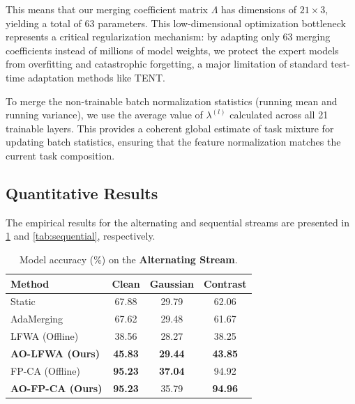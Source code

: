 \documentclass{article}
\theoremstyle{plain}
\theoremstyle{definition}
\begin{document}
This means that our merging coefficient matrix $\Lambda$ has dimensions of $21 \times 3$, yielding a total of 63 parameters. This low-dimensional optimization bottleneck represents a critical regularization mechanism: by adapting only 63 merging coefficients instead of millions of model weights, we protect the expert models from overfitting and catastrophic forgetting, a major limitation of standard test-time adaptation methods like TENT.

To merge the non-trainable batch normalization statistics (running mean and running variance), we use the average value of $\lambda^{(l)}$ calculated across all 21 trainable layers. This provides a coherent global estimate of task mixture for updating batch statistics, ensuring that the feature normalization matches the current task composition.

\subsection{Quantitative Results}

The empirical results for the alternating and sequential streams are presented in \cref{tab:alternating} and \cref{tab:sequential}, respectively.

\begin{table}[t]
\caption{Model accuracy (\%) on the \textbf{Alternating Stream}.}
\label{tab:alternating}
\vskip 0.08in
\centering
\begin{small}
\begin{sc}
\begin{tabular}{lccc}
\toprule
Method & Clean & Gaussian & Contrast \\
\midrule
Static     & 67.88 & 29.79 & 62.06 \\
AdaMerging & 67.62 & 29.48 & 61.67 \\
\midrule
LFWA (Offline)  & 38.56 & 28.27 & 38.25 \\
\textbf{AO-LFWA (Ours)} & \textbf{45.83} & \textbf{29.44} & \textbf{43.85} \\
\midrule
FP-CA (Offline)  & \textbf{95.23} & \textbf{37.04} & 94.92 \\
\textbf{AO-FP-CA (Ours)} & \textbf{95.23} & 35.79 & \textbf{94.96} \\
\bottomrule
\end{tabular}
\end{sc}
\end{small}
\vskip -0.1in
\end{table}
\end{document}
